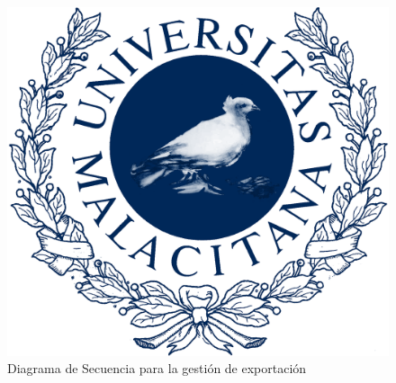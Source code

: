\begin{figure}[H]
    \includegraphics[width=1\linewidth]{assets/umaLogo.png}
    \caption{Diagrama de Secuencia para la gestión de exportación}
\end{figure}
